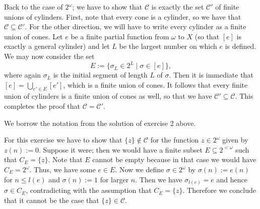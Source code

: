 \documentclass{article}
\begin{document}
\begin{ex}
Back to the case of $2^\omega$; we have to show that $\mathcal{C}$ is exactly the set $\mathcal{C}'$ of finite unions of cylinders. First, note that every cone is a cylinder, so we have that $\mathcal{C}\subseteq\mathcal{C}'$. For the other direction, we will have to write every cylinder as a finite union of cones. Let $e$ be a finite partial function from $\omega$ to $X$ (so that $[e]$ is exactly a general cylinder) and let $L$ be the largest number on which $e$ is defined. We may now consider the set
\begin{equation*}
E:=\{\sigma_L\in 2^L\mid\sigma\in[e]\},
\end{equation*}  
where again $\sigma_L$ is the initial segment of length $L$ of $\sigma$. Then it is immediate that $[e]=\bigcup_{e'\in E}[e']$, which is a finite union of cones. It follows that every finite union of cylinders is a finite union of cones as well, so that we have $\mathcal{C}'\subseteq\mathcal{C}$. This completes the proof that $\mathcal{C}=\mathcal{C}'$.  
\end{ex}

\begin{ex}
We borrow the notation from the solution of exercise 2 above.

For this exercise we have to show that $\{z\}\notin\mathcal{C}$ for the function $z\in 2^\omega$ given by $z(n):=0$. Suppose it were; then we would have a finite subset $E\subseteq 2^{<\omega}$ such that $C_E=\{z\}$. Note that $E$ cannot be empty because in that case we would have $C_E=2^\omega$. Thus, we have some $e\in E$. Now we define $\sigma\in 2^\omega$ by $\sigma(n):=e(n)$ for $n\leq l(e)$ and $\sigma(n):=1$ for larger $n$. Then we have $\sigma_{l(e)}=e$ and hence $\sigma\in C_E$, contradicting with the assumption that $C_E=\{z\}$. Therefore we conclude that it cannot be the case that $\{z\}\in\mathcal{C}$. 
\end{ex}
\end{document}
